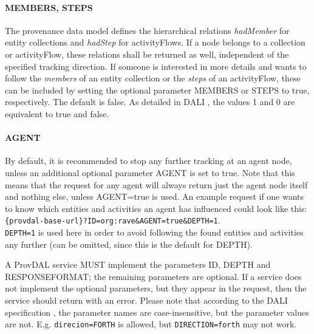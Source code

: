 \paragraph{MEMBERS, STEPS}
The provenance data model defines the hierarchical relations \emph{hadMember} for entity collections and \emph{hadStep} for activityFlows. If a node belongs to a collection or activityFlow, these relations shall be returned as well, independent of the specified tracking direction.
If someone is interested in more details and wants to follow the \emph{members} of an entity collection or the \emph{steps} of an activityFlow, these can be included by setting the optional parameter MEMBERS or STEPS to true, respectively. The default is false. As detailed in DALI \citep{std:DALI}, the values 1 and 0 are equivalent to true and false.

\paragraph{AGENT}
By default, it is recommended to stop any further tracking at an agent node, unless an additional optional parameter AGENT is set to true. Note that this means that the request for any agent will always return just the agent node itself and nothing else, unless AGENT=true is used. An example request if one wants to know which entities and activities an agent has influenced could look like this:\\
\texttt{\{provdal-base-url\}?ID=org:rave\&AGENT=true\&DEPTH=1}.\\
\texttt{DEPTH=1} is used here in order to avoid following the found entities and activities any further (can be omitted, since this is the default for DEPTH).
\newline



A ProvDAL service MUST implement the parameters ID, DEPTH and RESPONSEFORMAT; the remaining parameters are optional.
If a service does not implement the optional parameters, but they appear in the request, then the service should return with an error.
Please note that according to the DALI specification \citep{std:DALI}, the parameter names are case-insensitive, but the parameter values are not. E.g. \texttt{direcion=FORTH} is allowed, but \texttt{DIRECTION=forth} may not work.

